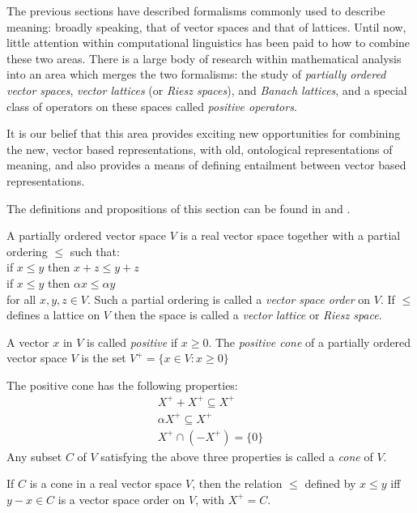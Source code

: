 \documentclass[12pt]{report}
\begin{document}
The previous sections have described formalisms commonly used to describe meaning: broadly speaking, that of vector spaces and that of lattices. Until now, little attention within computational linguistics has been paid to how to combine these two areas. There is a large body of research within mathematical analysis into an area which merges the two formalisms: the study of \emph{partially ordered vector spaces}, \emph{vector lattices} (or \emph{Riesz spaces}), and \emph{Banach lattices}, and a special class of operators on these spaces called \emph{positive operators}.

It is our belief that this area provides exciting new opportunities for combining the new, vector based representations, with old, ontological representations of meaning, and also provides a means of defining entailment between vector based representations.

The definitions and propositions of this section can be found in \cite{Abramovich:02} and \cite{Aliprantis:85}.

\begin{defn}
A partially ordered vector space $V$ is a real vector space together with a partial ordering $\le$ such that:
\vspace{0.1cm}\\
\indent if $x \le y$ then $x + z \le y + z$\\
\indent if $x \le y$ then $\alpha x \le \alpha y$
\vspace{0.1cm}\\
for all $x,y,z \in V$. Such a partial ordering is called a \emph{vector space order} on $V$. If $\le$ defines a lattice on $V$ then the space is called a \emph{vector lattice} or \emph{Riesz space}.

A vector $x$ in $V$ is called \emph{positive} if $x \ge 0$. The \emph{positive cone} of a partially ordered vector space $V$ is the set $V^+ = \{x \in V : x \ge 0\}$
\end{defn}

The positive cone has the following properties:
\begin{eqnarray*}
X^+ + X^+ \subseteq X^+\\
\alpha X^+ \subseteq X^+\\
X^+ \cap (-X^+) = \{0\}
\end{eqnarray*}
Any subset $C$ of $V$ satisfying the above three properties is called a \emph{cone} of $V$.

\begin{prop}
If $C$ is a cone in a real vector space $V$, then the relation $\le$ defined by $x \le y$ iff $y - x \in C$ is a vector space order on $V$, with $X^+ = C$.
\end{prop}
\end{document}
